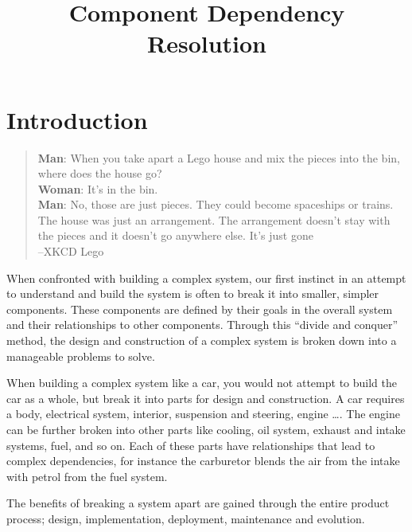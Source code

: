 \documentclass{report}
\title{Component Dependency Resolution}
\begin{document}
\chapter{Introduction}


\begin{quotation}
\textbf{Man}: When you take apart a Lego house and mix the pieces into the bin, where does the house go?\\
\textbf{Woman}: It's in the bin.\\
\textbf{Man}: No, those are just pieces. They could become spaceships or trains. 
The house was just an arrangement. The arrangement doesn't stay with the pieces and it doesn't go anywhere else. It's just gone\\
--XKCD Lego
\end{quotation}

{}When confronted with building a complex system, our first instinct in an attempt to understand and build the system is often to break it into smaller, simpler components. 
{}These components are defined by their goals in the overall system and their relationships to other components.
{}Through this ``divide and conquer'' method, the design and construction of a complex system is broken down into a manageable problems to solve.

When building a complex system like a car, you would not attempt to build the car as a whole, but break it into parts for design and construction.
A car requires a body, electrical system, interior, suspension and steering, engine \ldots. 
The engine can be further broken into other parts like cooling, oil system, exhaust and intake systems, fuel, and so on.
Each of these parts have relationships that lead to complex dependencies, for instance the carburetor blends the air from the intake with petrol from the fuel system.

The benefits of breaking a system apart are gained through the entire product process; design, implementation, deployment, maintenance and evolution.


\end{document}
